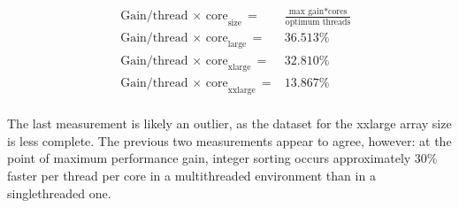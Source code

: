 \documentclass{article}
\begin{document}
\begin{eqnarray*}
&\textrm{Gain/thread $\times$ core}_{\textrm{size}} =& \frac {\textrm{max
    gain} * \textrm{cores}} {\textrm{optimum threads}}\\
&\textrm{Gain/thread $\times$ core}_\textrm{large} =& 36.513\%\\
&\textrm{Gain/thread $\times$ core}_\textrm{xlarge} =& 32.810\%\\
&\textrm{Gain/thread $\times$ core}_\textrm{xxlarge} =& 13.867\%\\
\end{eqnarray*}

The last measurement is likely an outlier, as the dataset for the
xxlarge array size is less complete. The previous two measurements
appear to agree, however: at the point of maximum performance gain,
integer sorting occurs approximately 30\% faster per thread per core
in a multithreaded environment than in a singlethreaded
one. 




\nocite{*}
\end{document}
